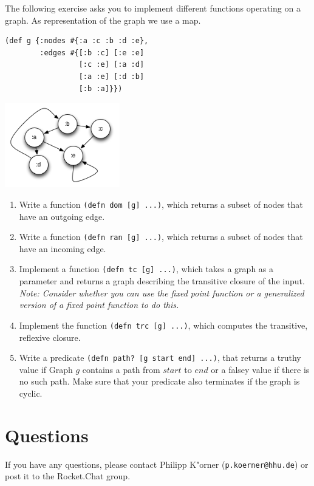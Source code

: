 \documentclass[11pt,a4paper]{article}
\begin{document}
\begin{exercise}[Graph]
The following exercise asks you to implement different functions operating on a graph. As representation of the graph we use a map.

\begin{multicols}{2}[]
\begin{verbatim}
(def g {:nodes #{:a :c :b :d :e}, 
        :edges #{[:b :c] [:e :e] 
                 [:c :e] [:a :d] 
                 [:a :e] [:d :b] 
                 [:b :a]}})
\end{verbatim}

\includegraphics[width=5cm]{graph}

\end{multicols}



\begin{enumerate}[label=\alph*)]
  \item Write a function \texttt{(defn dom [g] ...)}, which returns a subset of nodes that have an outgoing edge.
  \item Write a function \texttt{(defn ran [g] ...)}, which returns a subset of nodes that have an incoming edge.
  \item Implement a function \texttt{(defn tc [g] ...)}, which takes a graph as a parameter and returns a graph describing the transitive closure of the input. {\it Note: Consider whether you can use the fixed point function or a generalized version of a fixed point function to do this.}
  
  \item Implement the function \texttt{(defn trc [g] ...)}, which computes the transitive, reflexive closure.

  \item Write a predicate \texttt{(defn path? [g start end] ...)}, that returns a truthy value if Graph $g$ contains a path from $start$ to $end$ or a falsey value if there is no such path. Make sure that your predicate also terminates if the graph is cyclic.
\end{enumerate}
\end{exercise}


	\section*{Questions}
	If you have any questions, please contact Philipp K"orner (\texttt{p.koerner@hhu.de}) or post it to the Rocket.Chat group.
\end{document}
